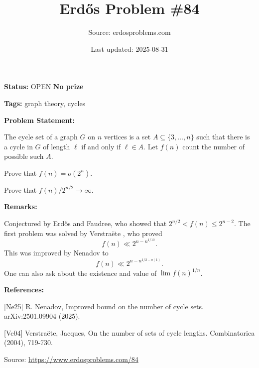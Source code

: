 \documentclass{article}
\title{Erd\H{o}s Problem \#84}
\date{Last updated: 2025-08-31}
\author{Source: erdosproblems.com}
\begin{document}
\maketitle

\noindent\textbf{Status:} OPEN \quad \textbf{No prize}

\noindent\textbf{Tags:} graph theory, cycles

\medskip
\noindent\textbf{Problem Statement:}

The cycle set of a graph $G$ on $n$ vertices is a set $A\subseteq \{3,\ldots,n\}$ such that there is a cycle in $G$ of length $\ell$ if and only if $\ell \in A$. Let $f(n)$ count the number of possible such $A$. 

Prove that $f(n)=o(2^n)$.

Prove that $f(n)/2^{n/2}\to \infty$.

\bigskip
\noindent\textbf{Remarks:}

Conjectured by Erd\H{o}s and Faudree, who showed that $2^{n/2}<f(n) \leq 2^{n-2}$. The first problem was solved by Verstra\"{e}te \cite{Ve04}, who proved\[f(n)\ll 2^{n-n^{1/10}}.\]This was improved by Nenadov \cite{Ne25} to\[f(n) \ll 2^{n-n^{1/2-o(1)}}.\]One can also ask about the existence and value of $\lim f(n)^{1/n}$.

\bigskip
\noindent\textbf{References:}

[Ne25] R. Nenadov, Improved bound on the number of cycle sets. arXiv:2501.09904 (2025).
 
 [Ve04] Verstra\"{e}te, Jacques, On the number of sets of cycle lengths. Combinatorica (2004), 719-730.

\bigskip
\noindent\small{Source: \url{https://www.erdosproblems.com/84}}
\end{document}

